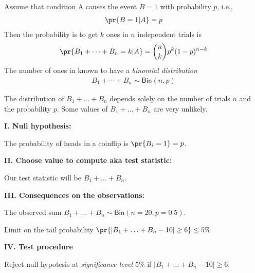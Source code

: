 \documentclass[landscape,footrule]{foils}
\begin{document}

Assume that condition A causes the event $B=1$ with probability $p$, i.e.,
\begin{align*}
\pr{B=1|A}=p
\end{align*}
Then the probability is to get $k$ ones in $n$ independent trials is
\begin{align*}
\pr{B_1+\cdots+B_n=k|A}=\binom{n}{k}p^k(1-p)^{n-k}
\end{align*} 
The number of ones in known to have a \emph{binomial distribution}
\begin{align*}
 B_1+\cdots+B_n\sim\mathsf{Bin}(n, p)
\end{align*}


\vspace*{-1cm}

The distribution of  $B_1+\ldots+B_n$ depends solely on the number of trials $n$ and the probability $p$. Some values of $B_1+\ldots+B_n$ are very unlikely.


\textbf{I. Null hypothesis:}
\begin{triangles}
\item The probability of heads in a coinflip is $\pr{B_i=1}=p$.
\end{triangles}
\vspace*{1cm}

\textbf{II. Choose value to compute aka test statistic:} 
\begin{triangles}
\item Our test statistic will be $B_1+\ldots+B_n$.
\end{triangles}
\vspace*{1cm}


\textbf{III. Consequences on the observations:} 
\begin{triangles}
\item The observed sum $B_1+\ldots+B_n\sim\mathsf{Bin}(n=20, p=0.5)$.
\item Limit on the tail probability $\pr{|B_1+\ldots+B_n-10|\geq 6}\leq 5\%$
\end{triangles}
\vspace*{1cm}

\textbf{IV. Test procedure}
\begin{triangles}
\item Reject null hypotesis at \emph{significance level} $5\%$ if $|B_1+\ldots+B_n-10|\geq 6$.  
\end{triangles}
 
\end{document}

